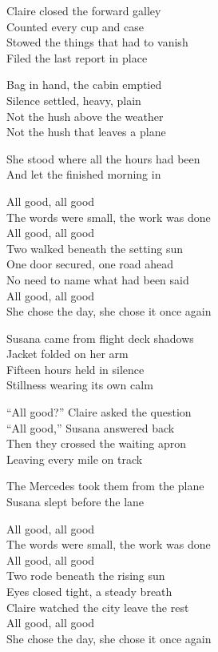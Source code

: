 \begin{lyrics}
Claire closed the forward galley\\
Counted every cup and case\\
Stowed the things that had to vanish\\
Filed the last report in place

Bag in hand, the cabin emptied\\
Silence settled, heavy, plain\\
Not the hush above the weather\\
Not the hush that leaves a plane

She stood where all the hours had been\\
And let the finished morning in

All good, all good\\
The words were small, the work was done\\
All good, all good\\
Two walked beneath the setting sun\\
One door secured, one road ahead\\
No need to name what had been said\\
All good, all good\\
She chose the day, she chose it once again

Susana came from flight deck shadows\\
Jacket folded on her arm\\
Fifteen hours held in silence\\
Stillness wearing its own calm

“All good?” Claire asked the question\\
“All good,” Susana answered back\\
Then they crossed the waiting apron\\
Leaving every mile on track

The Mercedes took them from the plane\\
Susana slept before the lane

All good, all good\\
The words were small, the work was done\\
All good, all good\\
Two rode beneath the rising sun\\
Eyes closed tight, a steady breath\\
Claire watched the city leave the rest\\
All good, all good\\
She chose the day, she chose it once again


\end{lyrics}
